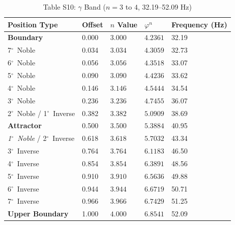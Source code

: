 \documentclass[11pt,a4paper]{article}
\newcommand{\degree}{$^\circ$}  %
\begin{document}
\begin{table}[H]
\centering
\caption*{Table S10: $\gamma$ Band ($n = 3$ to $4$, 32.19--52.09 Hz)}
\begin{tabular}{@{}lllll@{}}
\toprule
Position Type & Offset & $n$ Value & $\varphi^n$ & Frequency (Hz) \\
\midrule
\textbf{Boundary} & 0.000 & $3.000$ & $4.2361$ & 32.19 \\
7\degree\ Noble & 0.034 & $3.034$ & $4.3059$ & 32.73 \\
6\degree\ Noble & 0.056 & $3.056$ & $4.3518$ & 33.07 \\
5\degree\ Noble & 0.090 & $3.090$ & $4.4236$ & 33.62 \\
4\degree\ Noble & 0.146 & $3.146$ & $4.5444$ & 34.54 \\
3\degree\ Noble & 0.236 & $3.236$ & $4.7455$ & 36.07 \\
2\degree\ Noble / 1\degree\ Inverse & 0.382 & $3.382$ & $5.0909$ & 38.69 \\
\textbf{Attractor} & 0.500 & $3.500$ & $5.3884$ & 40.95 \\
\textit{1\degree\ Noble} / 2\degree\ Inverse & 0.618 & $3.618$ & $5.7032$ & 43.34 \\
3\degree\ Inverse & 0.764 & $3.764$ & $6.1183$ & 46.50 \\
4\degree\ Inverse & 0.854 & $3.854$ & $6.3891$ & 48.56 \\
5\degree\ Inverse & 0.910 & $3.910$ & $6.5636$ & 49.88 \\
6\degree\ Inverse & 0.944 & $3.944$ & $6.6719$ & 50.71 \\
7\degree\ Inverse & 0.966 & $3.966$ & $6.7429$ & 51.25 \\
\textbf{Upper Boundary} & 1.000 & $4.000$ & $6.8541$ & 52.09 \\
\bottomrule
\end{tabular}
\end{table}
\end{document}
